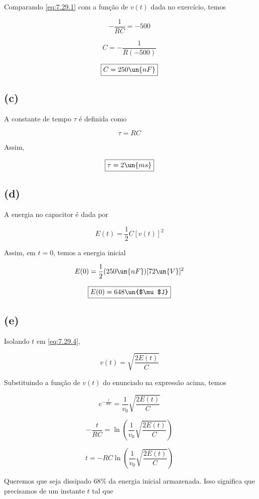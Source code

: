 Comparando \eqref{eq:7.29.1} com a função de $v(t)$ dada no exercício, temos   

\[ -\frac{1}{RC} = -500 \]

\[ C = -\frac{1}{R(-500)} \]

\[ \boxed{C = 250 \un{nF}}  \]

\subsection*{(c)}

A constante de tempo $\tau$ é definida como

\begin{equation}\label{eq:7.29.3}
    \tau = RC
\end{equation}

Assim,

\[ \boxed{\tau = 2 \un{ms}}  \]

\subsection*{(d)}

A energia no capacitor é dada por   

\begin{equation}\label{eq:7.29.4}
    E(t) = \frac{1}{2}C[v(t)]^2
\end{equation}

Assim, em $t=0$, temos a energia inicial  

\[ E(0) = \frac{1}{2}(250 \un{nF})[72\un{V}]^2  \]

\[ \boxed{E(0) = 648 \un{$\mu$J}}  \]

\subsection*{(e)}

Isolando $t$ em \eqref{eq:7.29.4}, 

\[ v(t) = \sqrt{\frac{2E(t)}{C}}  \]

Substituindo a função de $v(t)$ do enunciado na expressão acima, temos   

\[ e^{-\frac{t}{RC}} = \frac{1}{v_0} \sqrt{\frac{2E(t)}{C}}  \]

\[ -\frac{t}{RC} = \ln \left(\frac{1}{v_0} \sqrt{\frac{2E(t)}{C}}\right)   \]

\[ t = -RC\ln \left(\frac{1}{v_0} \sqrt{\frac{2E(t)}{C}}\right)   \]

Queremos que seja dissipado $68\%$ da energia inicial armazenada. Isso significa que precisamos de um instante $t$ tal que

